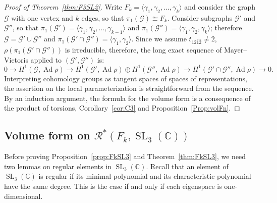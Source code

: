 \documentclass[11pt]{article}
\theoremstyle{definition}
\numberwithin{equation}{section}
\numberwithin{figure}{section}
\numberwithin{table}{section}
\DeclareMathOperator{\SL}{SL}
\DeclareMathOperator{\Ad}{Ad}
\newcommand{\Rcal}{\mathcal{R}}
\newcommand{\Gcal}{\mathcal{G}}
\newcommand{\Cbb}{\mathbb{C}}
\begin{document}
\begin{proof}[Proof of Theorem~\ref{thm:F3SL2}]
Write $F_k=\langle\gamma_1,\gamma_2,\dots,\gamma_k\rangle$ and consider the graph $\Gcal$ with one vertex and $k$ edges, so that $\pi_1(\Gcal)\cong F_k$. Consider subgraphs $\Gcal'$ and $\Gcal''$, so that $\pi_1(\Gcal')=\langle\gamma_1,\gamma_2,\dots,\gamma_{k-1}\rangle$ and $\pi_1(\Gcal'')=\langle\gamma_1,\gamma_2,\gamma_{k}\rangle$; therefore $\Gcal =\Gcal'\cup \Gcal''$ and $\pi_1(\Gcal'\cap \Gcal'')=\langle\gamma_1,\gamma_2\rangle$. Since we assume $t_{12\bar 1\bar 2}\neq 2$, $\rho(\pi_1 (\Gcal'\cap \Gcal''))$ is irreducible, therefore, the long exact sequence of Mayer--Vietoris applied to $(\Gcal', \Gcal'') $ is:
\begin{equation}
0 \to H^1(\Gcal,\Ad\rho)\to H^1(\Gcal',\Ad\rho)\oplus H^1(\Gcal'',\Ad\rho)\to H^1(\Gcal'\cap \Gcal'',\Ad\rho)\to 0.
\end{equation}
Interpreting cohomology groups as tangent spaces of spaces of representations, the assertion on the local parameterization is straightforward from the sequence. By an induction argument, the formula for the volume form is a consequence of the product of torsions, Corollary~\ref{cor:C3} and Proposition~\ref{Prop:volFn}.
\end{proof}



\subsection{Volume form on \texorpdfstring{$\Rcal^*(F_k,\SL_3(\Cbb))$}{R*(Fk, SL3(CC))}}

Before proving Proposition~\ref{prop:FkSL3} and Theorem~\ref{thm:FkSL3}, we need two lemmas on regular elements in $\SL_3(\Cbb)$. Recall that an element of $\SL_3(\Cbb)$ is regular if its minimal polynomial and its characteristic polynomial have the same degree. This is the case if and only if each eigenspace is one-dimensional.
\end{document}
